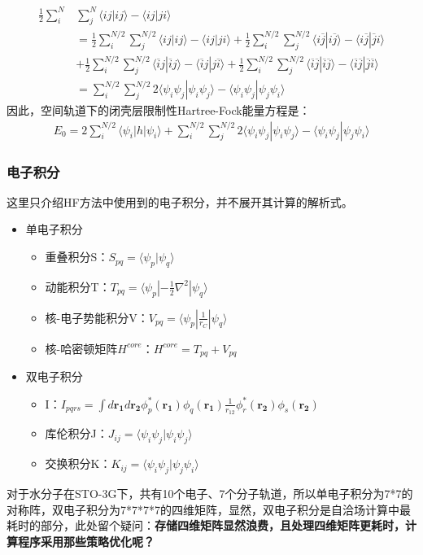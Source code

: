 \documentclass[12pt, a4paper, oneside]{ctexart}
\begin{document}
\begin{equation}
\begin{aligned}
\frac12\sum_i^N&\sum_j^N\langle ij|ij\rangle-\langle ij|ji\rangle\\
&=\frac12\sum_i^{N/2}\sum_j^{N/2}\langle ij|ij\rangle-\langle ij|ji\rangle+\frac12\sum_i^{N/2}\sum_j^{N/2}\langle i\overline{j}|i\overline{j}\rangle-\langle i\overline{j}|\overline{j}i\rangle\\
&+\frac12\sum_i^{N/2}\sum_j^{N/2}\langle \overline{i}j|\overline{i}j\rangle-\langle \overline{i}j|j\overline{i}\rangle+\frac12\sum_i^{N/2}\sum_j^{N/2}\langle \overline{i}\overline{j}|\overline{i}\overline{j}\rangle-\langle \overline{i}\overline{j}|\overline{j}\overline{i}\rangle\\
&=\sum_i^{N/2}\sum_j^{N/2}2\langle\psi_i\psi_j|\psi_i\psi_j\rangle-\langle\psi_i\psi_j|\psi_j\psi_i\rangle
\end{aligned}
\end{equation}
因此，空间轨道下的闭壳层限制性Hartree-Fock能量方程是：
\begin{equation}
\begin{aligned}
E_0=2\sum_i^{N/2}\langle\psi_i|h|\psi_i\rangle+\sum_i^{N/2}\sum_j^{N/2}2\langle\psi_i\psi_j|\psi_i\psi_j\rangle-\langle\psi_i\psi_j|\psi_j\psi_i\rangle
\end{aligned}
\end{equation}

\subsubsection{电子积分}
  这里只介绍HF方法中使用到的电子积分，并不展开其计算的解析式。
\begin{itemize}
  \item 单电子积分
  \begin{itemize}
    \item 重叠积分S：$S_{pq}=\langle\psi_p|\psi_q\rangle$
    \item 动能积分T：$T_{pq}=\langle\psi_p|-\frac{1}{2}\nabla^2|\psi_q\rangle$
    \item 核-电子势能积分V：$V_{pq}=\langle\psi_p|\frac{1}{r_C}|\psi_q\rangle$
	\item 核-哈密顿矩阵$H^{core}$：$H^{core}=T_{pq}+V_{pq}$
  \end{itemize}
  \item 双电子积分
\begin{itemize}
\item I：$I_{pqrs} = \int d\mathbf{r_1} d\mathbf{r_2} \phi_p^*(\mathbf{r_1}) \phi_q(\mathbf{r_1})\frac1{r_{12}} \phi_r^*(\mathbf{r_2}) \phi_s(\mathbf{r_2})$
  \item 库伦积分J：$J_{ij}=\langle\psi_i\psi_j|\psi_i\psi_j\rangle$
  \item 交换积分K：$K_{ij}=\langle\psi_i\psi_j|\psi_j\psi_i\rangle$
\end{itemize}
\end{itemize}
对于水分子在STO-3G下，共有10个电子、7个分子轨道，所以单电子积分为7*7的对称阵，双电子积分为7*7*7*7的四维矩阵，显然，双电子积分是自洽场计算中最耗时的部分，此处留个疑问：\textbf{存储四维矩阵显然浪费，且处理四维矩阵更耗时，计算程序采用那些策略优化呢？}
\end{document}
